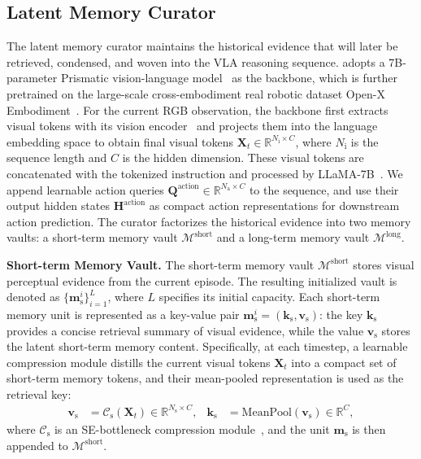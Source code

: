 \subsection{Latent Memory Curator}
\label{sec:curator}
The latent memory curator maintains the historical evidence that will later be retrieved, condensed, and woven into the VLA reasoning sequence.
\ourmethod adopts a 7B-parameter Prismatic vision-language model~\cite{karamcheti2024prismatic} as the backbone, which is further pretrained on the large-scale cross-embodiment real robotic dataset Open-X Embodiment~\cite{o2024open}.
For the current RGB observation, the backbone first extracts visual tokens with its vision encoder~\cite{oquabdinov2,zhai2023sigmoid} and projects them into the language embedding space to obtain final visual tokens $\bm{X}_t\!\in\!\mathbb{R}^{N_\text{i}\times C}$, where $N_\text{i}$ is the sequence length and $C$ is the hidden dimension.
These visual tokens are concatenated with the tokenized instruction and processed by LLaMA-7B~\cite{touvron2023llama}.
We append learnable action queries $\bm{Q}^\text{action}\!\in\!\mathbb{R}^{N_\text{a}\times C}$ to the sequence, and use their output hidden states $\bm{H}^\text{action}$ as compact action representations for downstream action prediction.
The curator factorizes the historical evidence into two memory vaults: a short-term memory vault $\mathcal{M}^\text{short}$ and a long-term memory vault $\mathcal{M}^\text{long}$.

\noindent\textbf{Short-term Memory Vault.}
The short-term memory vault $\mathcal{M}^\text{short}$ stores visual perceptual evidence from the current episode.
The resulting initialized vault is denoted as $\{\bm{m}_\text{s}^i\}_{i=1}^L$, where $L$ specifies its initial capacity.
Each short-term memory unit is represented as a key-value pair $\bm{m}_\text{s}^i=(\bm{k}_\text{s},\bm{v}_\text{s})$:
the key $\bm{k}_\text{s}$ provides a concise retrieval summary of visual evidence, while the value $\bm{v}_\text{s}$ stores the latent short-term memory content.
Specifically, at each timestep, a learnable compression module distills the current visual tokens $\bm{X}_t$ into a compact set of short-term memory tokens, and their mean-pooled representation is used as the retrieval key:
\begin{equation}
    \label{eq:visual_memory_bank}
    \begin{aligned}
        \bm{v}_\text{s} &= \mathcal{C}_\text{s}(\bm{X}_t) \in \mathbb{R}^{N_\text{s} \times C}, &
        \bm{k}_\text{s} &= \mathrm{MeanPool}(\bm{v}_\text{s}) \in \mathbb{R}^{C},
    \end{aligned}
\end{equation}
where $\mathcal{C}_\text{s}$ is an SE-bottleneck compression module~\cite{hu2018squeeze}, and the unit $\bm{m}_\text{s}$ is then appended to $\mathcal{M}^\text{short}$.

